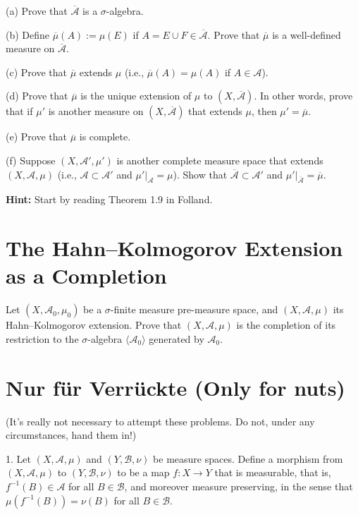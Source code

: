 \documentclass[lang=cn,11pt]{elegantbook}
\begin{document}
(a) Prove that \(\overline{\mathcal{A}}\) is a \(\sigma\)-algebra.

(b) Define \(\overline{\mu}(A) := \mu(E)\) if \(A = E \cup F \in \overline{\mathcal{A}}\). Prove that \(\overline{\mu}\) is a well-defined measure on \(\overline{\mathcal{A}}\).

(c) Prove that \(\overline{\mu}\) extends \(\mu\) (i.e., \(\overline{\mu}(A) = \mu(A)\) if \(A \in \mathcal{A}\)).

(d) Prove that \(\overline{\mu}\) is the unique extension of \(\mu\) to \((X, \overline{\mathcal{A}})\). In other words, prove that if \(\mu'\) is another measure on \((X, \overline{\mathcal{A}})\) that extends \(\mu\), then \(\mu' = \overline{\mu}\).

(e) Prove that \(\overline{\mu}\) is complete.

(f) Suppose \((X, \mathcal{A}', \mu')\) is another complete measure space that extends \((X, \mathcal{A}, \mu)\) (i.e., \(\mathcal{A} \subset \mathcal{A}'\) and \(\mu'|_{\mathcal{A}} = \mu\)). Show that \(\overline{\mathcal{A}} \subset \mathcal{A}'\) and \(\mu'|_{\overline{\mathcal{A}}} = \overline{\mu}\). 

\textbf{Hint:} Start by reading Theorem 1.9 in Folland.

\section{The Hahn--Kolmogorov Extension as a Completion}
Let \((X, \mathcal{A}_0, \mu_0)\) be a \(\sigma\)-finite measure pre-measure space, and \((X, \mathcal{A}, \mu)\) its Hahn–Kolmogorov extension. Prove that \((X, \mathcal{A}, \mu)\) is the completion of its restriction to the \(\sigma\)-algebra \(\langle \mathcal{A}_0 \rangle\) generated by \(\mathcal{A}_0\).



\section{Nur für Verrückte (Only for nuts)}
(It’s really not necessary to attempt these problems. Do not, under any circumstances, hand them in!)

1. Let \((X, \mathcal{A}, \mu)\) and \((Y, \mathcal{B}, \nu)\) be measure spaces. Define a morphism from \((X, \mathcal{A}, \mu)\) to \((Y, \mathcal{B}, \nu)\) to be a map \(f : X \to Y\) that is measurable, that is, \(f^{-1}(B) \in \mathcal{A}\) for all \(B \in \mathcal{B}\), and moreover measure preserving, in the sense that \(\mu(f^{-1}(B)) = \nu(B)\) for all \(B \in \mathcal{B}\).
\end{document}
